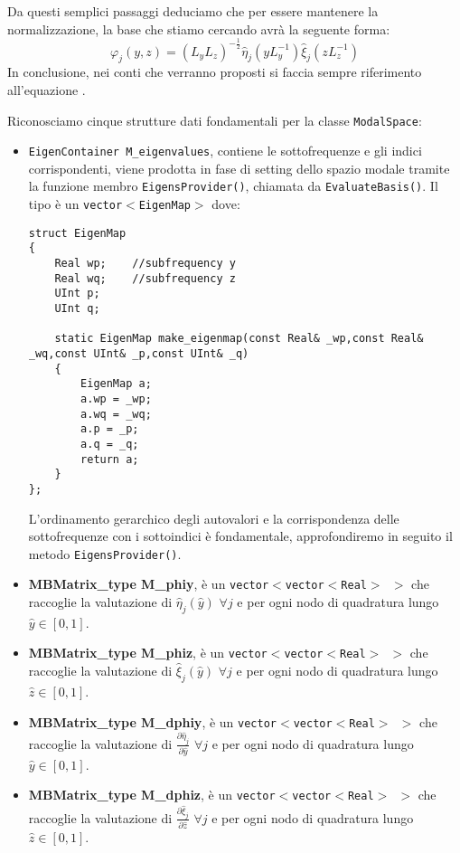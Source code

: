 Da questi semplici passaggi deduciamo che per essere mantenere la normalizzazione, la base che stiamo cercando avr\`a la seguente forma:
\begin{equation}
\label{eq: base sul dominio corrente}
\varphi_j(y,z) = (L_yL_z)^{-\frac{1}{2}}\hat{\eta}_j(yL_y^{-1})\hat{\xi}_j(zL_z^{-1})
\end{equation}
In conclusione, nei conti che verranno proposti si faccia sempre riferimento all'equazione .

Riconosciamo cinque strutture dati fondamentali per la classe \texttt{ModalSpace}:

\begin{itemize}

\item \texttt{EigenContainer M\_eigenvalues}, contiene le sottofrequenze e gli indici corrispondenti, viene prodotta in fase di setting dello spazio modale tramite la funzione membro \texttt{EigensProvider()}, chiamata da \texttt{EvaluateBasis()}. Il tipo \`e un \texttt{vector$<$EigenMap$>$} dove:
 
\begin{lstlisting}[style = general]
struct EigenMap
{
	Real wp;	//subfrequency y
	Real wq;	//subfrequency z
	UInt p;
	UInt q;
	
	static EigenMap make_eigenmap(const Real& _wp,const Real& _wq,const UInt& _p,const UInt& _q)
	{
		EigenMap a;
		a.wp = _wp;
		a.wq = _wq;
		a.p = _p;
		a.q = _q;
		return a;	
	}
};
\end{lstlisting}
L'ordinamento gerarchico degli autovalori e la corrispondenza delle sottofrequenze con i sottoindici \`e fondamentale, approfondiremo in seguito il metodo \texttt{EigensProvider()}.

\item \textbf{MBMatrix\_type M\_phiy}, \`e un \texttt{vector$<$vector$<$Real$>$ $>$} che raccoglie la valutazione di $\hat{\eta}_j(\hat{y})$ $\forall j$ e per ogni nodo di quadratura lungo $\hat{y}\in[0,1]$.

\item \textbf{MBMatrix\_type M\_phiz}, \`e un \texttt{vector$<$vector$<$Real$>$ $>$} che raccoglie la valutazione di $\hat{\xi}_j(\hat{y})$ $\forall j$ e per ogni nodo di quadratura lungo $\hat{z}\in[0,1]$.

\item \textbf{MBMatrix\_type M\_dphiy}, \`e un \texttt{vector$<$vector$<$Real$>$ $>$} che raccoglie la valutazione di $\frac{\partial\hat{\eta}_j}{\partial 	\hat{y}}$ $\forall j$ e per ogni nodo di quadratura lungo $\hat{y}\in[0,1]$.

\item \textbf{MBMatrix\_type M\_dphiz}, \`e un \texttt{vector$<$vector$<$Real$>$ $>$} che raccoglie la valutazione di $\frac{\partial\hat{\xi}_j}{\partial 	\hat{z}}$ $\forall j$ e per ogni nodo di quadratura lungo $\hat{z}\in[0,1]$.

\end{itemize}


